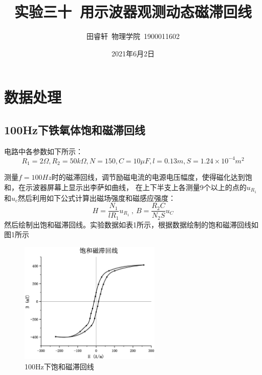 \documentclass{article}
\title{\heiti 实验三十\ 用示波器观测动态磁滞回线}
\author{\kaishu 田睿轩\ 物理学院\ 1900011602}
\date{2021年6月2日}
\begin{document}
    \maketitle
    \section{数据处理}
    \subsection{100Hz下铁氧体饱和磁滞回线}
    电路中各参数如下所示：
    $$R_1=2\Omega,R_2=50k\Omega,N=150,C=10\mu F,l=0.13m,S=1.24\times 10^{-4}m^2$$

    测量$f=100Hz$时的磁滞回线，调节励磁电流的电源电压幅度，使得磁化达到饱和，在示波器屏幕上显示出李萨如曲线，
    在上下半支上各测量9个以上的点的$u_{R_1}$和$u_c$然后利用如下公式计算出磁场强度和磁感应强度：
    $$H=\frac{N_{1}}{l R_{1}} u_{R_{1}}\ ,\ B=\frac{R_{2} C}{N_{2} S} u_{C}$$
    然后绘制出饱和磁滞回线。实验数据如表1所示，根据数据绘制的饱和磁滞回线如图1所示

    \begin{figure}[h]
        \centering
        \includegraphics[width=0.6\textwidth]{饱和磁滞回线.eps}
        \caption{100Hz下饱和磁滞回线}
    \end{figure}
\end{document}
